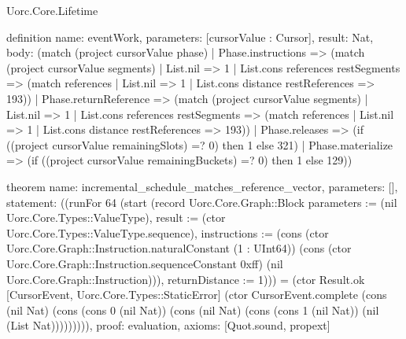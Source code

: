 \begin{lexlean}{Uorc.Core.Lifetime}
\begin{semanticmodule}
definition{
  name: eventWork,
  parameters: [cursorValue : Cursor],
  result: Nat,
  body: (match (project cursorValue phase)
    | Phase.instructions => (match (project cursorValue segments)
      | List.nil => 1
      | List.cons references restSegments => (match references
        | List.nil => 1
        | List.cons distance restReferences => 193))
    | Phase.returnReference => (match (project cursorValue segments)
      | List.nil => 1
      | List.cons references restSegments => (match references
        | List.nil => 1
        | List.cons distance restReferences => 193))
    | Phase.releases => (if ((project cursorValue remainingSlots) =? 0) then 1 else 321)
    | Phase.materialize => (if ((project cursorValue remainingBuckets) =? 0) then 1 else 129))
}

theorem{
  name: incremental_schedule_matches_reference_vector,
  parameters: [],
  statement: ((runFor 64 (start (record Uorc.Core.Graph::Block {parameters := (nil Uorc.Core.Types::ValueType), result := (ctor Uorc.Core.Types::ValueType.sequence), instructions := (cons (ctor Uorc.Core.Graph::Instruction.naturalConstant (1 : UInt64)) (cons (ctor Uorc.Core.Graph::Instruction.sequenceConstant 0xff) (nil Uorc.Core.Graph::Instruction))), returnDistance := 1}))) = (ctor Result.ok [CursorEvent, Uorc.Core.Types::StaticError] (ctor CursorEvent.complete (cons (nil Nat) (cons (cons 0 (nil Nat)) (cons (nil Nat) (cons (cons 1 (nil Nat)) (nil (List Nat))))))))),
  proof: evaluation{},
  axioms: [Quot.sound, propext]
}
\end{semanticmodule}
\end{lexlean}
